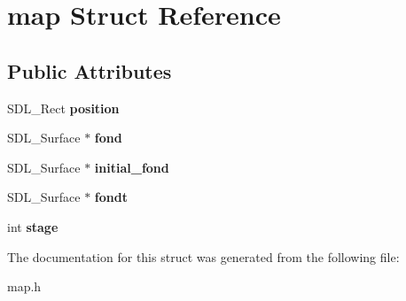 \hypertarget{structmap}{}\section{map Struct Reference}
\label{structmap}
\subsection*{Public Attributes}
\begin{DoxyCompactItemize}
\item 
\mbox{\label{structmap_a22eebe2fbf7d3d3fea525b97643fb9fc}} 
S\+D\+L\+\_\+\+Rect {\bfseries position}
\item 
\mbox{\label{structmap_a38064e9b5686f65248082cb565bbce7b}} 
S\+D\+L\+\_\+\+Surface $\ast$ {\bfseries fond}
\item 
\mbox{\label{structmap_aad66dc00cf07f929c7f656d985602c68}} 
S\+D\+L\+\_\+\+Surface $\ast$ {\bfseries initial\+\_\+fond}
\item 
\mbox{\label{structmap_a8cc569b2c652f68bca54f9ba48e2f222}} 
S\+D\+L\+\_\+\+Surface $\ast$ {\bfseries fondt}
\item 
\mbox{\label{structmap_ac6374ee3907f782e878f3641d4fc974d}} 
int {\bfseries stage}
\end{DoxyCompactItemize}


The documentation for this struct was generated from the following file\+:\begin{DoxyCompactItemize}
\item 
map.\+h\end{DoxyCompactItemize}
